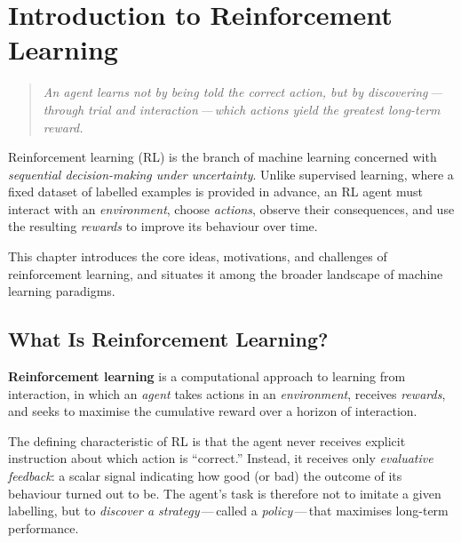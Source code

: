 \chapter{Introduction to Reinforcement Learning}
\label{ch:intro}

\begin{quote}
\itshape
An agent learns not by being told the correct action, but by discovering\,---\,through trial and interaction\,---\,which actions yield the greatest long-term reward.
\end{quote}

\bigskip

Reinforcement learning (RL) is the branch of machine learning concerned with \emph{sequential decision-making under uncertainty}.  Unlike supervised learning, where a fixed dataset of labelled examples is provided in advance, an RL agent must interact with an \emph{environment}, choose \emph{actions}, observe their consequences, and use the resulting \emph{rewards} to improve its behaviour over time.

This chapter introduces the core ideas, motivations, and challenges of reinforcement learning, and situates it among the broader landscape of machine learning paradigms.


\section{What Is Reinforcement Learning?}
\label{sec:what-is-rl}

\begin{definition}
\label{def:rl}
\textbf{Reinforcement learning} is a computational approach to learning from interaction, in which an \emph{agent} takes actions in an \emph{environment}, receives \emph{rewards}, and seeks to maximise the cumulative reward over a horizon of interaction.
\end{definition}

The defining characteristic of RL is that the agent never receives explicit instruction about which action is ``correct.''  Instead, it receives only \emph{evaluative feedback}: a scalar signal indicating how good (or bad) the outcome of its behaviour turned out to be.  The agent's task is therefore not to imitate a given labelling, but to \emph{discover a strategy}\,---\,called a \emph{policy}\,---\,that maximises long-term performance.

